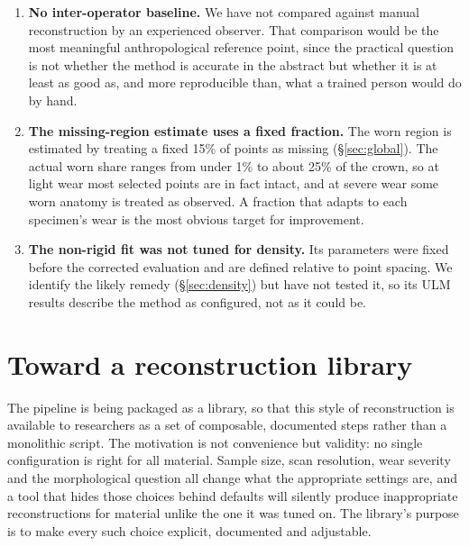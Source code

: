 \documentclass[10pt,a4paper,twocolumn]{article}
\begin{document}
\begin{enumerate}
        cannot be shown to hold across teeth. The worn EDJ meshes available to us
        were truncated files; the EDJ wear mask therefore uses the
        $100{,}000$-point samples taken from the intact meshes in Stage~1, which
        the mask rule is designed to accept (\S\ref{sec:protocol}).
  \item \textbf{No inter-operator baseline.} We have not compared against manual
        reconstruction by an experienced observer. That comparison would be the
        most meaningful anthropological reference point, since the practical
        question is not whether the method is accurate in the abstract but
        whether it is at least as good as, and more reproducible than, what a
        trained person would do by hand.
  \item \textbf{The missing-region estimate uses a fixed fraction.} The worn
        region is estimated by treating a fixed 15\% of points as missing
        (\S\ref{sec:global}). The actual worn share ranges from under 1\% to
        about 25\% of the crown, so at light wear most selected points are in
        fact intact, and at severe wear some worn anatomy is treated as observed.
        A fraction that adapts to each specimen's wear is the most obvious
        target for improvement.
  \item \textbf{The non-rigid fit was not tuned for density.} Its parameters
        were fixed before the corrected evaluation and are defined relative to
        point spacing. We identify the likely remedy (\S\ref{sec:density}) but
        have not tested it, so its ULM results describe the method as
        configured, not as it could be.
\end{enumerate}
\section{Toward a reconstruction library}
\label{sec:library}

The pipeline is being packaged as a library, so that this style of reconstruction
is available to researchers as a set of composable, documented steps rather than
a monolithic script. The motivation is not convenience but validity: no single
configuration is right for all material. Sample size, scan resolution, wear
severity and the morphological question all change what the appropriate settings
are, and a tool that hides those choices behind defaults will silently produce
inappropriate reconstructions for material unlike the one it was tuned on. The
library's purpose is to make every such choice explicit, documented and
adjustable.
\end{document}
